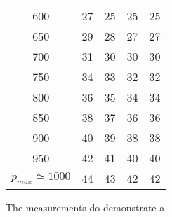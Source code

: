 \begin{table}[]
\begin{tabular}{S[table-format=3.0] S S S S}
		600                      & 27                                     & 25    & 25    & 25    \\
		650                      & 29                                     & 28    & 27    & 27    \\
		700                      & 31                                     & 30    & 30    & 30    \\
		750                      & 34                                     & 33    & 32    & 32    \\
		800                      & 36                                     & 35    & 34    & 34    \\
		850                      & 38                                     & 37    & 36    & 36    \\
		900                      & 40                                     & 39    & 38    & 38    \\
		950                      & 42                                     & 41    & 40    & 40    \\
		{$p_{max} \simeq 1000$}  & 44                                     & 43    & 42    & 42    \\
		\bottomrule
	\end{tabular}
\end{table}


The measurements do demonstrate a